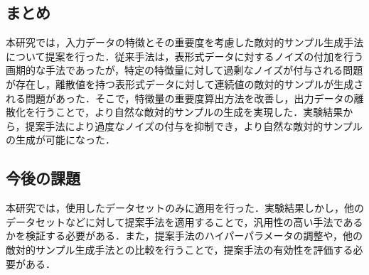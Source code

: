 \subsection{まとめ}
本研究では，入力データの特徴とその重要度を考慮した敵対的サンプル生成手法について提案を行った．従来手法は，表形式データに対するノイズの付加を行う画期的な手法であったが，特定の特徴量に対して過剰なノイズが付与される問題が存在し，離散値を持つ表形式データに対して連続値の敵対的サンプルが生成される問題があった．そこで，特徴量の重要度算出方法を改善し，出力データの離散化を行うことで，より自然な敵対的サンプルの生成を実現した．実験結果から，提案手法により過度なノイズの付与を抑制でき，より自然な敵対的サンプルの生成が可能になった．
\subsection{今後の課題}
本研究では，使用したデータセットのみに適用を行った．実験結果しかし，他のデータセットなどに対して提案手法を適用することで，汎用性の高い手法であるかを検証する必要がある．また，提案手法のハイパーパラメータの調整や，他の敵対的サンプル生成手法との比較を行うことで，提案手法の有効性を評価する必要がある．